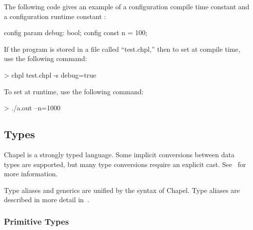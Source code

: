 \begin{example}
The following code gives an example of a configuration compile time
constant  and a configuration runtime constant :
\begin{chapel}
config param debug: bool;
config const n = 100;
\end{chapel}

If the program is stored in a file called ``test.chpl,'' then to
set  at compile time, use the following command:
\begin{commandline}
> chpl test.chpl -s debug=true
\end{commandline}

To set  at runtime, use the following command:
\begin{commandline}
> ./a.out --n=1000
\end{commandline}
\end{example}

\subsection{Types}

Chapel is a strongly typed language.  Some implicit conversions 
between data types are supported, but many type conversions require
an explicit cast.  See~ for more information. 

Type aliases and generics are unified by the syntax of Chapel.  Type
aliases are described in more detail in~.

\subsubsection{Primitive Types}

